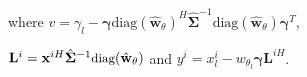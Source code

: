     where $v = \gamma_l -  \boldsymbol{\gamma}  \text{diag}(\hat{\mathbf{w}}_{\theta})^H \hat{\mathbf{\Sigma}}^{-1} \text{diag}(\hat{\mathbf{w}}_{\theta}) \boldsymbol{\gamma}^T$, 
    
    \noindent
    $\small \mathbf{L}^i = \small \mathbf{x}^{iH} \hat{\mathbf{\Sigma}}^{-1} \text{diag}(\hat{\mathbf{w}}_{\theta})$ and $y^i = x_{l}^i - w_{\theta_{l}} \boldsymbol{\gamma} \mathbf{L}^{iH}$.